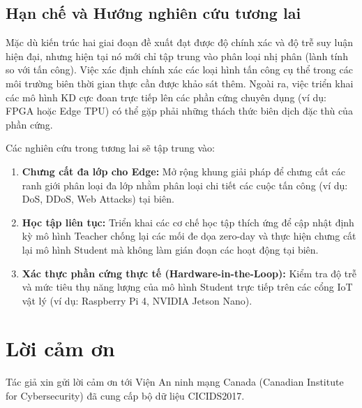 \subsection{Hạn chế và Hướng nghiên cứu tương lai}
Mặc dù kiến trúc hai giai đoạn đề xuất đạt được độ chính xác và độ trễ suy luận hiện đại, nhưng hiện tại nó mới chỉ tập trung vào phân loại nhị phân (lành tính so với tấn công). Việc xác định chính xác các loại hình tấn công cụ thể trong các môi trường biên thời gian thực cần được khảo sát thêm. Ngoài ra, việc triển khai các mô hình KD cực đoan trực tiếp lên các phần cứng chuyên dụng (ví dụ: FPGA hoặc Edge TPU) có thể gặp phải những thách thức biên dịch đặc thù của phần cứng.

Các nghiên cứu trong tương lai sẽ tập trung vào:
\begin{enumerate}
    \item \textbf{Chưng cất đa lớp cho Edge:} Mở rộng khung giải pháp để chưng cất các ranh giới phân loại đa lớp nhằm phân loại chi tiết các cuộc tấn công (ví dụ: DoS, DDoS, Web Attacks) tại biên.
    \item \textbf{Học tập liên tục:} Triển khai các cơ chế học tập thích ứng để cập nhật định kỳ mô hình Teacher chống lại các mối đe dọa zero-day và thực hiện chưng cất lại mô hình Student mà không làm gián đoạn các hoạt động tại biên.
    \item \textbf{Xác thực phần cứng thực tế (Hardware-in-the-Loop):} Kiểm tra độ trễ và mức tiêu thụ năng lượng của mô hình Student trực tiếp trên các cổng IoT vật lý (ví dụ: Raspberry Pi 4, NVIDIA Jetson Nano).
\end{enumerate}

\appendix
\section{Lời cảm ơn}
Tác giả xin gửi lời cảm ơn tới Viện An ninh mạng Canada (Canadian Institute for Cybersecurity) đã cung cấp bộ dữ liệu CICIDS2017.
